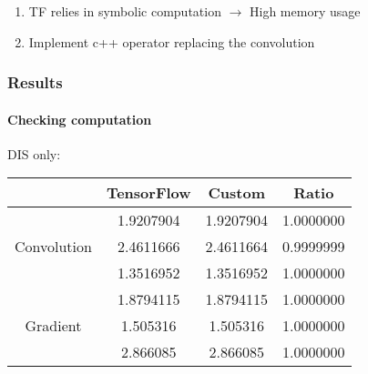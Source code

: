 \documentclass[aspectratio=43]{beamer}
\begin{document}
\begin{frame}
	
	\begin{enumerate}
		\item TF relies in symbolic computation $\longrightarrow$ High memory usage
		\item Implement c++ operator replacing the convolution
	\end{enumerate}

\end{frame}

\begin{frame}

	\frametitle{Results}
	\framesubtitle{Checking computation}
	
	{\Large DIS only:}
	\begin{table}
		\centering
		\begin{tabular}{c c c c}
			& TensorFlow & Custom & Ratio \\ \hline
			& 1.9207904 & 1.9207904 & {\color{darkgreen} 1.0000000} \\
			Convolution & 2.4611666 & 2.4611664 & {\color{darkgreen} 0.9999999} \\
			& 1.3516952 & 1.3516952 & {\color{darkgreen} 1.0000000} \\
			\hline
			& 1.8794115 & 1.8794115 & {\color{darkgreen} 1.0000000} \\
			Gradient & 1.505316 & 1.505316 & {\color{darkgreen} 1.0000000} \\
			& 2.866085 & 2.866085 & {\color{darkgreen} 1.0000000} \\
			\hline
		\end{tabular}
	\end{table}

\end{frame}
\end{document}
